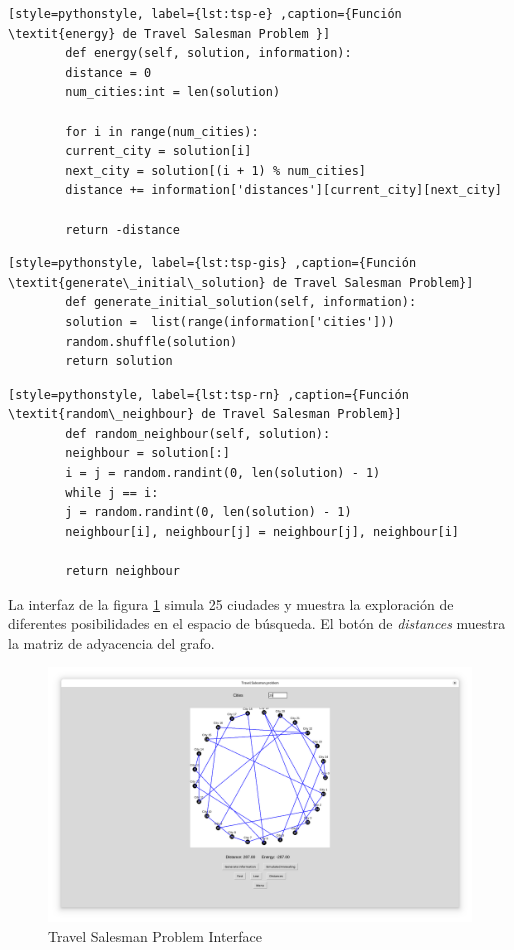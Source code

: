 \documentclass[12pt,twoside]{article}
\begin{document}
	\begin{lstlisting}[style=pythonstyle, label={lst:tsp-e} ,caption={Función \textit{energy} de Travel Salesman Problem }]
		def energy(self, solution, information):
		distance = 0
		num_cities:int = len(solution)
		
		for i in range(num_cities):
		current_city = solution[i]
		next_city = solution[(i + 1) % num_cities]  
		distance += information['distances'][current_city][next_city]
		
		return -distance
	\end{lstlisting}
	
	\begin{lstlisting}[style=pythonstyle, label={lst:tsp-gis} ,caption={Función \textit{generate\_initial\_solution} de Travel Salesman Problem}]
		def generate_initial_solution(self, information):
		solution =  list(range(information['cities']))
		random.shuffle(solution)
		return solution     
	\end{lstlisting}
	
	\begin{lstlisting}[style=pythonstyle, label={lst:tsp-rn} ,caption={Función \textit{random\_neighbour} de Travel Salesman Problem}]
		def random_neighbour(self, solution):
		neighbour = solution[:]
		i = j = random.randint(0, len(solution) - 1)
		while j == i:
		j = random.randint(0, len(solution) - 1)
		neighbour[i], neighbour[j] = neighbour[j], neighbour[i]
		
		return neighbour
	\end{lstlisting}
	
	La interfaz de la figura \ref{fig:tsp} simula 25 ciudades y muestra la exploración de diferentes posibilidades en el espacio de búsqueda. El botón de \textit{distances} muestra la matriz de adyacencia del grafo.
	
	\begin{figure}[h!]
		\centering
		\includegraphics[width=\linewidth]{img/tsp}
		\caption{Travel Salesman Problem Interface}
		\label{fig:tsp}
	\end{figure}
	
\end{document}
